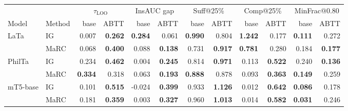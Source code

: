 \begin{table}[t]
\centering
\small
\setlength{\tabcolsep}{5pt}
\begin{tabular}{llrrrrrrrrrr}
\toprule
& & \multicolumn{2}{c}{$\tau_{\text{LOO}}$} & \multicolumn{2}{c}{InsAUC gap} & \multicolumn{2}{c}{Suff@25\%} & \multicolumn{2}{c}{Comp@25\%} & \multicolumn{2}{c}{MinFrac@0.80} \\
\cmidrule(lr){3-4}\cmidrule(lr){5-6}\cmidrule(lr){7-8}\cmidrule(lr){9-10}\cmidrule(lr){11-12}
Model & Method & base & ABTT & base & ABTT & base & ABTT & base & ABTT & base & ABTT \\
\midrule
LaTa & IG & 0.007 & \textbf{0.262} & \textbf{0.284} & 0.061 & \textbf{0.990} & 0.804 & \textbf{1.242} & 0.177 & \textbf{0.111} & 0.272 \\
 & MaRC & 0.068 & \textbf{0.400} & 0.088 & \textbf{0.138} & 0.731 & \textbf{0.917} & \textbf{0.781} & 0.280 & 0.184 & \textbf{0.177} \\
\addlinespace[2pt]
PhilTa & IG & 0.234 & \textbf{0.462} & 0.004 & \textbf{0.245} & 0.814 & \textbf{0.971} & 0.113 & \textbf{0.522} & 0.240 & \textbf{0.136} \\
 & MaRC & \textbf{0.334} & 0.318 & 0.063 & \textbf{0.193} & \textbf{0.888} & 0.878 & 0.093 & \textbf{0.363} & \textbf{0.149} & 0.259 \\
\addlinespace[2pt]
mT5-base & IG & 0.101 & \textbf{0.515} & -0.024 & \textbf{0.399} & 0.933 & \textbf{1.126} & 0.012 & \textbf{0.642} & \textbf{0.086} & 0.178 \\
 & MaRC & 0.181 & \textbf{0.359} & 0.003 & \textbf{0.327} & 0.960 & \textbf{1.013} & 0.014 & \textbf{0.582} & \textbf{0.031} & 0.246 \\
\bottomrule
\end{tabular}

\end{table}
